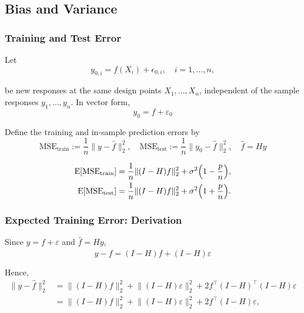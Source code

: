\subsection{Bias and Variance}

\subsubsection{Training and Test Error}
Let
\begin{equation*}
    y_{0,i} = f(X_i) + \epsilon_{0,i}, \quad i=1,\dots,n,
\end{equation*}

be new responses at the same design points $X_1,\dots,X_n$, independent of the sample responses $y_1,\dots,y_n$. In vector form,
\begin{equation*}
    y_0 = f + \varepsilon_0
\end{equation*}

Define the training and in-sample prediction errors by
\begin{equation*}
    \text{MSE}_{\text{train}} := \frac{1}{n}\lVert y-\hat f \rVert_2^2, \quad \text{MSE}_{\text{test}} := \frac{1}{n}\lVert y_0-\hat f \rVert_2^2, \quad \hat f = Hy
\end{equation*}

\begin{align*}
    \operatorname{E}[\text{MSE}_{\text{train}}] &= \frac{1}{n}\lVert (I-H)f \rVert_2^2 + \sigma^2\Big(1-\frac{p}{n}\Big), \\
    \operatorname{E}[\text{MSE}_{\text{test}}] &= \frac{1}{n}\lVert (I-H)f \rVert_2^2 + \sigma^2\Big(1+\frac{p}{n}\Big).
\end{align*}

\subsubsection{Expected Training Error: Derivation}
Since $y=f+\varepsilon$ and $\hat f = Hy$,
\begin{equation*}
    y-\hat f = (I-H)f + (I-H)\varepsilon
\end{equation*}

Hence,
\begin{align*}
    \lVert y-\hat f \rVert_2^2 &= \lVert (I-H)f \rVert_2^2 + \lVert (I-H)\varepsilon \rVert_2^2 + 2f^\top(I-H)^\top(I-H)\varepsilon \\
    &= \lVert (I-H)f \rVert_2^2 + \lVert (I-H)\varepsilon \rVert_2^2 + 2f^\top(I-H)\varepsilon,
\end{align*}


